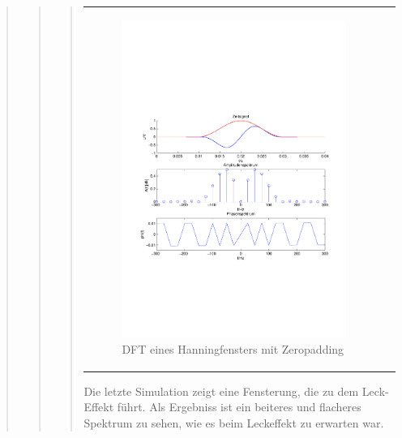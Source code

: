 \begin{quote}
\begin{quote}
\begin{quote}
\begin{center}
\begin{tabular}{ll}
\begin{minipage}{0.6\textwidth}
                         \begin{figure}[H]
                            \label{fig:}
                            \includegraphics[scale=0.5, trim = 1.5cm 7cm 1.5cm 8cm, clip]{./Bilder/Hanningwindowverkuerzt} %
                            \caption{DFT eines Hanningfensters mit Zeropadding}
                        \end{figure}
                   \vspace{-1.5em}
    
                    \end{minipage}
    
                \end{tabular}
                \end{center}
   
            Die letzte Simulation zeigt eine Fensterung, die zu dem Leck-Effekt
            führt. Als Ergebniss ist ein beiteres und flacheres Spektrum zu sehen, wie es beim Leckeffekt zu erwarten war.
    			

\end{quote}
\end{quote}
\end{quote}
